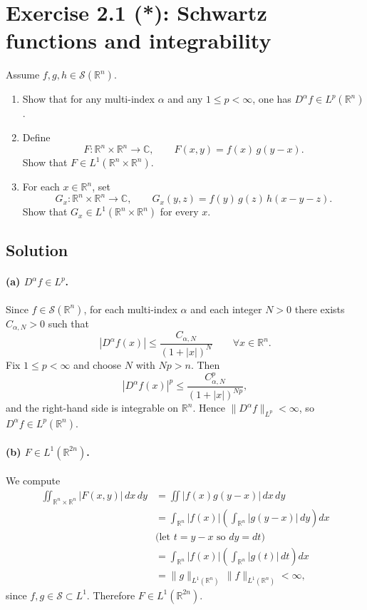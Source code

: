 \documentclass[12pt,a4paper]{article}
\theoremstyle{plain}
\theoremstyle{definition}
\theoremstyle{remark}
\theoremstyle{remark}
\begin{document}
\section*{Exercise 2.1 (*): Schwartz functions and integrability}

Assume $f,g,h\in \mathcal{S}(\mathbb{R}^n)$.

\begin{enumerate}
	\item[(a)] Show that for any multi-index $\alpha$ and any $1\le p<\infty$,
	one has $D^\alpha f\in L^p(\mathbb{R}^n)$.
	
	\item[(b)] Define
	\[
	F:\mathbb{R}^n\times\mathbb{R}^n\to\mathbb{C},\qquad
	F(x,y)=f(x)\,g(y-x).
	\]
	Show that $F\in L^1(\mathbb{R}^n\times\mathbb{R}^n)$.
	
	\item[(c)] For each $x\in\mathbb{R}^n$, set
	\[
	G_x:\mathbb{R}^n\times\mathbb{R}^n\to\mathbb{C},\qquad
	G_x(y,z)=f(y)\,g(z)\,h(x-y-z).
	\]
	Show that $G_x\in L^1(\mathbb{R}^n\times\mathbb{R}^n)$ for
	every $x$.
\end{enumerate}

\subsection*{Solution}

\paragraph{(a) $D^\alpha f\in L^p$.}
Since $f\in\mathcal{S}(\mathbb{R}^n)$, for each multi-index $\alpha$ and
each integer $N>0$ there exists $C_{\alpha,N}>0$ such that
\[
|D^\alpha f(x)|
\le \frac{C_{\alpha,N}}{(1+|x|)^N}
\qquad \forall x\in\mathbb{R}^n.
\]
Fix $1\le p<\infty$ and choose $N$ with $Np>n$. Then
\[
|D^\alpha f(x)|^p \le \frac{C_{\alpha,N}^p}{(1+|x|)^{Np}},
\]
and the right-hand side is integrable on $\mathbb{R}^n$. Hence
$\|D^\alpha f\|_{L^p}<\infty$, so $D^\alpha f\in L^p(\mathbb{R}^n)$.

\paragraph{(b) $F\in L^1(\mathbb{R}^{2n})$.}
We compute
\[
\begin{aligned}
	\iint_{\mathbb{R}^n\times\mathbb{R}^n}
	|F(x,y)|\,dx\,dy
	&= \iint |f(x)g(y-x)|\,dx\,dy \\
	&= \int_{\mathbb{R}^n} |f(x)|
	\left( \int_{\mathbb{R}^n} |g(y-x)|\,dy \right) dx \\
	&\text{(let $t=y-x$ so $dy=dt$)}\\
	&= \int_{\mathbb{R}^n} |f(x)|
	\left( \int_{\mathbb{R}^n} |g(t)|\,dt \right) dx \\
	&= \|g\|_{L^1(\mathbb{R}^n)} \,
	\|f\|_{L^1(\mathbb{R}^n)} < \infty,
\end{aligned}
\]
since $f,g\in\mathcal{S}\subset L^1$. Therefore $F\in L^1(\mathbb{R}^{2n})$.
\end{document}
